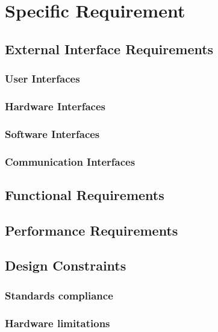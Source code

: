 \section{Specific Requirement}

\subsection{External Interface Requirements}

\subsubsection{User Interfaces}

\subsubsection{Hardware Interfaces}

\subsubsection{Software Interfaces}

\subsubsection{Communication Interfaces}

\subsection{Functional Requirements}

\subsection{Performance Requirements}

\subsection{Design
Constraints}

\subsubsection{Standards compliance}

\subsubsection{Hardware
limitations}

